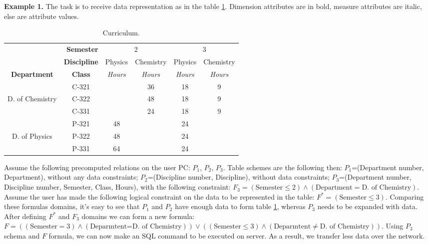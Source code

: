 \documentclass[10pt,a4paper]{article}
\begin{document}
{\bf Example 1.} The task is to receive data representation as in the table
\ref{def_T_1}. Dimension attributes are in bold, measure attributes are italic,
else are attribute values.

\begin{table}[h!]
\caption{\label{def_T_1} Curriculum.}
\begin{center}
\begin{tabular}{|c|c||c|c|c|c|}
\cline{2-6}
\multicolumn{1}{c|}{} & \multicolumn{1}{|r||}{\bf Semester} & \multicolumn{2}{|c|}{2} & \multicolumn{2}{|c|}{3}  \\
\cline{2-6}
\multicolumn{1}{c|}{} & {\bf Discipline} & Physics & Chemistry & Physics & Chemistry \\
\hline \cline{2-6}
{\bf Department} & {\bf Class} & {\it Hours} & {\it Hours} & {\it Hours} & {\it Hours} \\
\hline
 & C-321 & & 36 & 18 & 9 \\
\cline{2-6}
D. of Chemistry & C-322 & & 48 & 18 & 9 \\
\cline{2-6}
 & C-331 & & 24 & 18 & 9 \\
\hline
 & P-321 & 48 & & 24 & \\
\cline{2-6}
D. of Physics & P-322 & 48 & & 24 & \\
\cline{2-6}
 & P-331 & 64 & & 24 & \\
\hline
\end{tabular}
\end{center}
\end{table}
Assume the following precomputed relations on the user PC:  $P_1$,
$P_2$, $P_3$. Table schemes are the following then: $P_1$=(Department number, Department), without any data constraints; $P_2$=(Discipline number, Discipline), without data constraints; $P_3$=(Department number, Discipline number, Semester, Class, Hours), with the following constraint:
$F_3 =(\mbox{Semester} \leq 2) \wedge (\mbox{Department} = \mbox{D. of Chemistry})$.
Assume the user has made the following logical constraint on the data to be represented in the table: $F^{\ast} = (\mbox{Semester} \leq 3)$. Comparing these formulas domains, it's easy to see that $P_1$ and $P_2$ have enough data to form table \ref{def_T_1}, whereas $P_3$ needs to be expanded with data. After defining $F^{\ast}$ and $F_3$ domains we can form a new formula: $F=((\mbox{Semester} = 3) \wedge (\mbox{Deparmtent=D. of Chemistry}))
\vee ((\mbox{Semester} \leq 3) \wedge (\mbox{Deparmtent} \neq \mbox{D. of Chemistry}))$. Using $P_3$ schema and $F$ formula, we can now make an SQL command to be executed on server. As a result, we transfer less data over the network.
\end{document}
